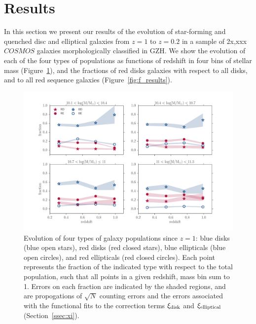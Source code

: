 \documentclass[useAMS,usenatbib]{mn2e}
\begin{document}
\section{Results}
\label{sec:results}
In this section we present our results of the evolution of star-forming and quenched disc and elliptical galaxies from $z=1$ to $z=0.2$ in a sample of 2x,xxx $COSMOS$ galaxies morphologically classified in GZH. We show the evolution of each of the four types of populations as functions of redshift in four bins of stellar mass (Figure~\ref{fig:all_plot}), and the fractions of red disks galaxies with respect to all disks, and to all red sequence galaxies (Figure~\ref{fig:f_results}).

\begin{figure}
\centering
\includegraphics[width=\textwidth,trim={0cm 0cm 2cm 1cm},clip]{figures/morphologies_evolved.pdf}
\caption{Evolution of four types of galaxy populations since $z=1$: blue disks (blue open stars), red disks (red closed stars), blue ellipticals (blue open circles), and red ellipticals (red closed circles). Each point represents the fraction of the indicated type with respect to the total population, such that all points in a given redshift, mass bin sum to 1. Errors on each fraction are indicated by the shaded regions, and are propogations of $\sqrt{N}$ counting errors and the errors associated with the functional fits to the correction terms $\xi_{\rm disk}$ and $\xi_{\rm elliptical}$ (Section~\ref{ssec:xi}). }
\label{fig:all_plot}
\end{figure}
\end{document}

